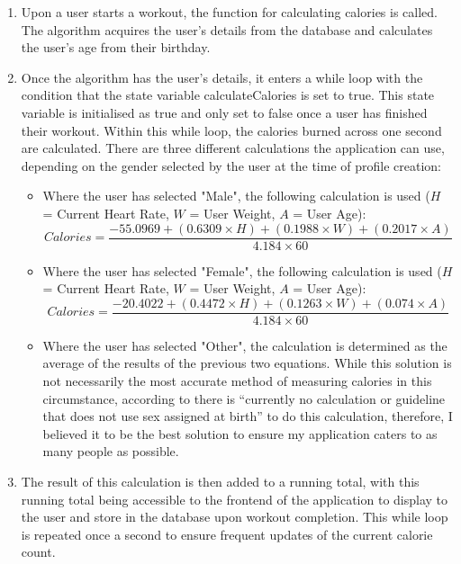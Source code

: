 \documentclass{l4proj}
\begin{document}
\begin{enumerate}
    \item Upon a user starts a workout, the function for calculating calories is called. The algorithm acquires the user’s details from the database and calculates the user’s age from their birthday.
    \item Once the algorithm has the user’s details, it enters a while loop with the condition that the state variable calculateCalories is set to true. This state variable is initialised as true and only set to false once a user has finished their workout. Within this while loop, the calories burned across one second are calculated. There are three different calculations the application can use, depending on the gender selected by the user at the time of profile creation:
    \begin{itemize}
        \item Where the user has selected "Male", the following calculation is used ($H$ = Current Heart Rate, $W$ = User Weight, $A$ = User Age):
        $$
            Calories = \frac{-55.0969 + (0.6309 \times H) + (0.1988 \times W) + (0.2017 \times A)}{4.184 \times 60}
        $$
        \item Where the user has selected "Female", the following calculation is used ($H$ = Current Heart Rate, $W$ = User Weight, $A$ = User Age):
        $$
            Calories = \frac{-20.4022 + (0.4472 \times H) + (0.1263 \times W) + (0.074 \times A)}{4.184 \times 60}
        $$
        \item Where the user has selected "Other", the calculation is determined as the average of the results of the previous two equations. While this solution is not necessarily the most accurate method of measuring calories in this circumstance, according to \cite{Trainerize_2024} there is “currently no calculation or guideline that does not use sex assigned at birth” to do this calculation, therefore, I believed it to be the best solution to ensure my application caters to as many people as possible.
    \end{itemize}

    \item The result of this calculation is then added to a running total, with this running total being accessible to the frontend of the application to display to the user and store in the database upon workout completion. This while loop is repeated once a second to ensure frequent updates of the current calorie count.
    
\end{enumerate}
\end{document}
